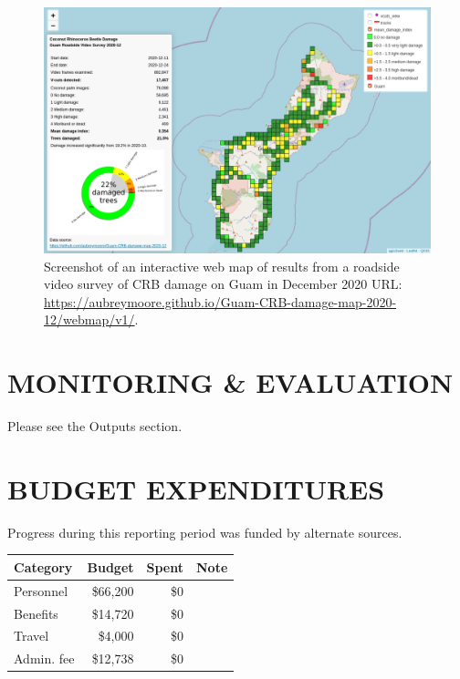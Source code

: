 \documentclass[12pt,letterpaper,english,bibliography=totocnumbered,abstract=on]{scrartcl}
\begin{document}
\begin{figure}[p]
	\centering
	\includegraphics[width=0.75\linewidth]{images/crb-webmap-2020-12.png}
	\caption{Screenshot of an interactive web map of results from a roadside video survey of CRB damage on Guam in December 2020 URL: \url{https://aubreymoore.github.io/Guam-CRB-damage-map-2020-12/webmap/v1/}.}
	\label{fig:webmap2}
\end{figure}




\clearpage
\section{MONITORING \& EVALUATION}

%

Please see the Outputs section.

\section{BUDGET EXPENDITURES}


Progress during this reporting period was funded by alternate sources.

\medskip
\begin{tabular}{lrrl}
	\hline
	Category & Budget & Spent & Note \\
	\hline 
	Personnel & \$66,200 & \$0 & \\ 
	Benefits & \$14,720 & \$0 & \\ 
	Travel & \$4,000 & \$0 & \\
	Admin. fee & \$12,738 & \$0 & \\ 
	\hline 
\end{tabular} 
\end{document}
